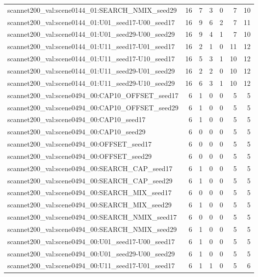 \begin{table}[t]
\begin{tabular}{lrrrrrr}
scannet200\_val:scene0144\_01:SEARCH\_NMIX\_seed29 & 16 & 7 & 3 & 0 & 7 & 10 \\
scannet200\_val:scene0144\_01:U01\_seed17-U00\_seed17 & 16 & 9 & 6 & 2 & 7 & 11 \\
scannet200\_val:scene0144\_01:U01\_seed29-U00\_seed29 & 16 & 9 & 4 & 1 & 7 & 10 \\
scannet200\_val:scene0144\_01:U11\_seed17-U01\_seed17 & 16 & 2 & 1 & 0 & 11 & 12 \\
scannet200\_val:scene0144\_01:U11\_seed17-U10\_seed17 & 16 & 5 & 3 & 1 & 10 & 12 \\
scannet200\_val:scene0144\_01:U11\_seed29-U01\_seed29 & 16 & 2 & 2 & 0 & 10 & 12 \\
scannet200\_val:scene0144\_01:U11\_seed29-U10\_seed29 & 16 & 6 & 3 & 1 & 10 & 12 \\
scannet200\_val:scene0494\_00:CAP10\_OFFSET\_seed17 & 6 & 1 & 0 & 0 & 5 & 5 \\
scannet200\_val:scene0494\_00:CAP10\_OFFSET\_seed29 & 6 & 1 & 0 & 0 & 5 & 5 \\
scannet200\_val:scene0494\_00:CAP10\_seed17 & 6 & 1 & 0 & 0 & 5 & 5 \\
scannet200\_val:scene0494\_00:CAP10\_seed29 & 6 & 0 & 0 & 0 & 5 & 5 \\
scannet200\_val:scene0494\_00:OFFSET\_seed17 & 6 & 0 & 0 & 0 & 5 & 5 \\
scannet200\_val:scene0494\_00:OFFSET\_seed29 & 6 & 0 & 0 & 0 & 5 & 5 \\
scannet200\_val:scene0494\_00:SEARCH\_CAP\_seed17 & 6 & 1 & 0 & 0 & 5 & 5 \\
scannet200\_val:scene0494\_00:SEARCH\_CAP\_seed29 & 6 & 1 & 0 & 0 & 5 & 5 \\
scannet200\_val:scene0494\_00:SEARCH\_MIX\_seed17 & 6 & 0 & 0 & 0 & 5 & 5 \\
scannet200\_val:scene0494\_00:SEARCH\_MIX\_seed29 & 6 & 1 & 0 & 0 & 5 & 5 \\
scannet200\_val:scene0494\_00:SEARCH\_NMIX\_seed17 & 6 & 0 & 0 & 0 & 5 & 5 \\
scannet200\_val:scene0494\_00:SEARCH\_NMIX\_seed29 & 6 & 1 & 0 & 0 & 5 & 5 \\
scannet200\_val:scene0494\_00:U01\_seed17-U00\_seed17 & 6 & 1 & 0 & 0 & 5 & 5 \\
scannet200\_val:scene0494\_00:U01\_seed29-U00\_seed29 & 6 & 1 & 0 & 0 & 5 & 5 \\
scannet200\_val:scene0494\_00:U11\_seed17-U01\_seed17 & 6 & 1 & 1 & 0 & 5 & 6 \\

\end{tabular}
\end{table}
